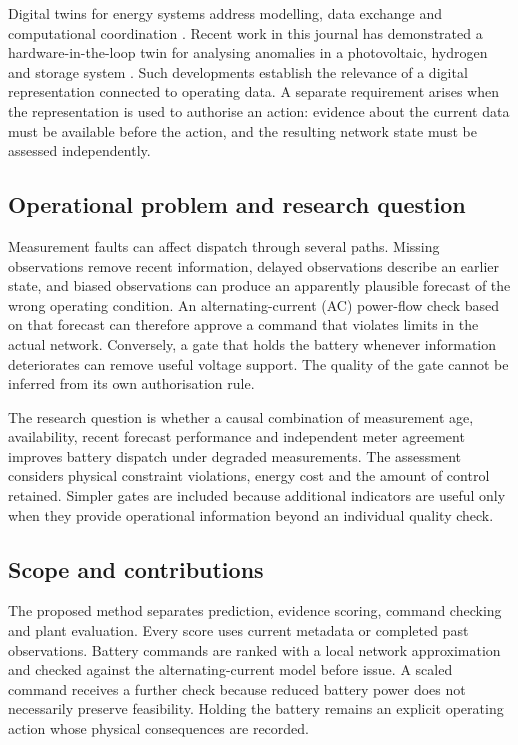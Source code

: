 \documentclass[11pt,a4paper]{article}
\begin{document}
Digital twins for energy systems address modelling, data exchange and computational coordination \cite{ardebili}. Recent work in this journal has demonstrated a hardware-in-the-loop twin for analysing anomalies in a photovoltaic, hydrogen and storage system \cite{hueros}. Such developments establish the relevance of a digital representation connected to operating data. A separate requirement arises when the representation is used to authorise an action: evidence about the current data must be available before the action, and the resulting network state must be assessed independently.

\subsection{Operational problem and research question}
Measurement faults can affect dispatch through several paths. Missing observations remove recent information, delayed observations describe an earlier state, and biased observations can produce an apparently plausible forecast of the wrong operating condition. An alternating-current (AC) power-flow check based on that forecast can therefore approve a command that violates limits in the actual network. Conversely, a gate that holds the battery whenever information deteriorates can remove useful voltage support. The quality of the gate cannot be inferred from its own authorisation rule.

The research question is whether a causal combination of measurement age, availability, recent forecast performance and independent meter agreement improves battery dispatch under degraded measurements. The assessment considers physical constraint violations, energy cost and the amount of control retained. Simpler gates are included because additional indicators are useful only when they provide operational information beyond an individual quality check.

\subsection{Scope and contributions}
The proposed method separates prediction, evidence scoring, command checking and plant evaluation. Every score uses current metadata or completed past observations. Battery commands are ranked with a local network approximation and checked against the alternating-current model before issue. A scaled command receives a further check because reduced battery power does not necessarily preserve feasibility. Holding the battery remains an explicit operating action whose physical consequences are recorded.
\end{document}
